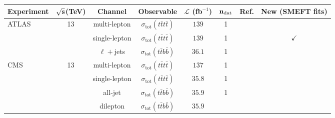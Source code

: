 \begin{table}[t]
  \begin{center}
{\fontsize{8pt}{8pt}\selectfont
  \centering
   \renewcommand{\arraystretch}{2.3}
   \setlength{\tabcolsep}{5pt}
   \begin{tabular}{lcccccc|c}
     \toprule \textbf{Experiment}     & $\bf{\sqrt{s}}$\textbf{(TeV)}
     &   \textbf{Channel} & \textbf{Observable} & $\mathcal{L}$ (fb${}^{-1}$) & $\mathbf{n_{\rm dat}}$ & \textbf{Ref.}   
    &  \textbf{New (SMEFT fits)} \\
    \toprule
    ATLAS
    & 13
    & multi-lepton
    & $\sigma_{\text{tot}}(t\bar{t}t\bar{t})$
    & $139$
    & 1
    &\cite{ATLAS:2020hpj}
    & \\
    & 
    & single-lepton
    & $\sigma_{\text{tot}}(t\bar{t}t\bar{t})$
    & $139$
    & 1
    & \cite{ATLAS:2021kqb}
    & $\checkmark$ \\
        & 
    & $\ell+$jets
    & $\sigma_{\text{tot}}(t\bar{t}b\bar{b})$
    & $36.1$
    & 1
    & \cite{ATLAS:2018fwl}
    & \\
  \midrule
      CMS
     & 13
    & multi-lepton
    & $\sigma_{\text{tot}}(t\bar{t}t\bar{t})$
    & $137$
    & 1
    & \cite{CMS:2019rvj}
    &  \\
     & 
    & single-lepton
    & $\sigma_{\text{tot}}(t\bar{t}t\bar{t})$
    & $35.8$
    & 1
    & \cite{CMS:2019jsc}
    &  \\
     & 
    & all-jet
    & $\sigma_{\text{tot}}(t\bar{t}b\bar{b})$
    & $35.9$
    & 1
    & \cite{CMS:2019eih}
    &  \\
     & 
    & dilepton
    & $\sigma_{\text{tot}}(t\bar{t}b\bar{b})$
    & $35.9$

\end{tabular}}
\end{center}
\end{table}
